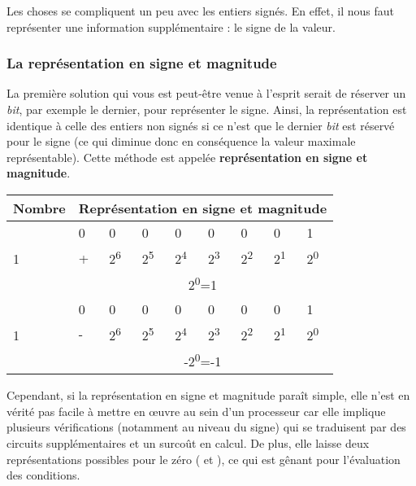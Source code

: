 Les choses se compliquent un peu avec les entiers signés. En effet, il
nous faut représenter une information supplémentaire : le signe de la
valeur.

\subsubsection{La représentation en signe et
magnitude}
\label{la-representation-en-signe-et-magnitude}

La première solution qui vous est peut-être venue à l'esprit serait de
réserver un \emph{bit}, par exemple le dernier, pour représenter le
signe. Ainsi, la représentation est identique à celle des entiers non
signés si ce n'est que le dernier \emph{bit} est réservé pour le signe
(ce qui diminue donc en conséquence la valeur maximale représentable).
Cette méthode est appelée \textbf{représentation en signe et magnitude}.

\begin{table}
\centering
\begin{tabular}{|l|l|l|l|l|l|l|l|l|}\hline
\rowcolor{gris-tab-entete}\bf Nombre & \multicolumn{8}{l|}{\bf Représentation en signe et magnitude}\\
  \hline
  \multirow{3}{2cm}{1} & 0 & 0 & 0 & 0 & 0 & 0 & 0 & 1 \\ 
  \cline{2-9}
    &+&2\textsuperscript{6}&2\textsuperscript{5}&2\textsuperscript{4}&2\textsuperscript{3}&2\textsuperscript{2}&2\textsuperscript{1}&2\textsuperscript{0}\\ 
  \cline{2-9}
   &\multicolumn{8}{c|}{2\textsuperscript{0}=1}\\ 
  \hline
  \multirow{3}{2cm}{1} & 0 & 0 & 0 & 0 & 0 & 0 & 0 & 1 \\ 
  \cline{2-9}
    &-&2\textsuperscript{6}&2\textsuperscript{5}&2\textsuperscript{4}&2\textsuperscript{3}&2\textsuperscript{2}&2\textsuperscript{1}&2\textsuperscript{0}\\ 
  \cline{2-9}
   &\multicolumn{8}{c|}{-2\textsuperscript{0}=-1}\\ 
  \hline
  \end{tabular}
\end{table}

Cependant, si la représentation en signe et magnitude paraît simple,
elle n'est en vérité pas facile à mettre en œuvre au sein d'un
processeur car elle implique plusieurs vérifications (notamment au
niveau du signe) qui se traduisent par des circuits supplémentaires et
un surcoût en calcul. De plus, elle laisse deux représentations
possibles pour le zéro ( et ), ce
qui est gênant pour l'évaluation des conditions.

